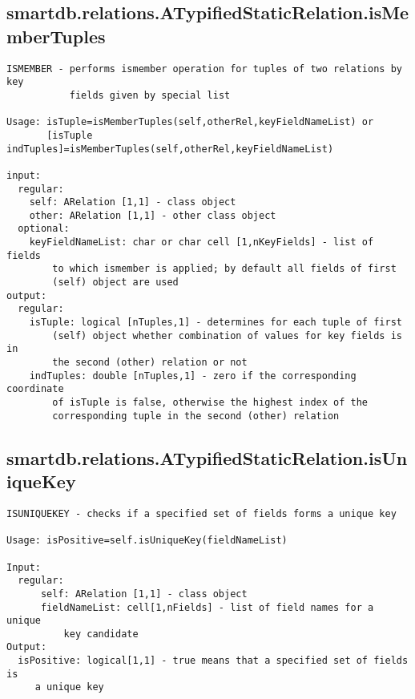 \subsection{\texorpdfstring{smartdb.relations.ATypifiedStaticRelation.isMemberTuples}{isMemberTuples}}\label{method:smartdb.relations.ATypifiedStaticRelation.isMemberTuples}
\begin{verbatim}
ISMEMBER - performs ismember operation for tuples of two relations by key
           fields given by special list

Usage: isTuple=isMemberTuples(self,otherRel,keyFieldNameList) or
       [isTuple indTuples]=isMemberTuples(self,otherRel,keyFieldNameList)

input:
  regular:
    self: ARelation [1,1] - class object
    other: ARelation [1,1] - other class object
  optional:
    keyFieldNameList: char or char cell [1,nKeyFields] - list of fields
        to which ismember is applied; by default all fields of first
        (self) object are used
output:
  regular:
    isTuple: logical [nTuples,1] - determines for each tuple of first
        (self) object whether combination of values for key fields is in
        the second (other) relation or not
    indTuples: double [nTuples,1] - zero if the corresponding coordinate
        of isTuple is false, otherwise the highest index of the
        corresponding tuple in the second (other) relation
\end{verbatim}
\subsection{\texorpdfstring{smartdb.relations.ATypifiedStaticRelation.isUniqueKey}{isUniqueKey}}\label{method:smartdb.relations.ATypifiedStaticRelation.isUniqueKey}
\begin{verbatim}
ISUNIQUEKEY - checks if a specified set of fields forms a unique key

Usage: isPositive=self.isUniqueKey(fieldNameList)

Input:
  regular:
      self: ARelation [1,1] - class object
      fieldNameList: cell[1,nFields] - list of field names for a unique
          key candidate
Output:
  isPositive: logical[1,1] - true means that a specified set of fields is
     a unique key
\end{verbatim}
